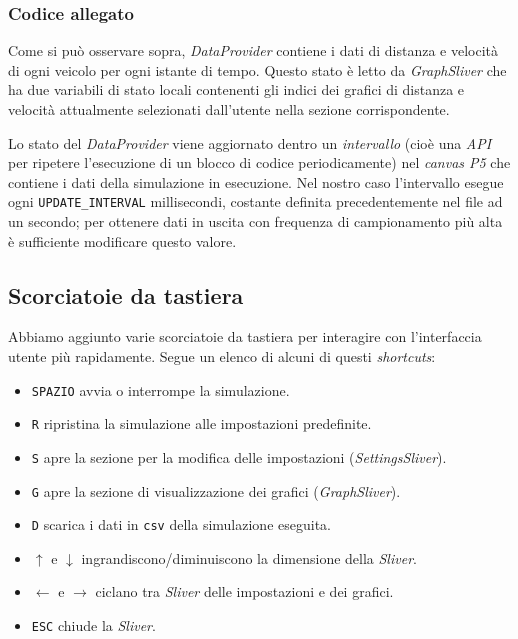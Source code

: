 \newpage
\subsubsection*{Codice allegato}

\vspace{0.3em}

\vspace{0.6em}

Come si può osservare sopra, \textit{DataProvider} contiene i dati di distanza e velocità di ogni veicolo per ogni istante di tempo. Questo stato è letto da \textit{GraphSliver} che ha due variabili di stato locali contenenti gli indici dei grafici di distanza e velocità attualmente selezionati dall'utente nella sezione corrispondente.

Lo stato del \textit{DataProvider} viene aggiornato dentro un \textit{intervallo} (cioè una \textit{API} per ripetere l'esecuzione di un blocco di codice periodicamente) nel \textit{canvas P5} che contiene i dati della simulazione in esecuzione. Nel nostro caso l'intervallo esegue ogni \texttt{UPDATE\_INTERVAL} millisecondi, costante definita precedentemente nel file ad un secondo; per ottenere dati in uscita con frequenza di campionamento più alta è sufficiente modificare questo valore.

\newpage
\subsection{Scorciatoie da tastiera}

Abbiamo aggiunto varie scorciatoie da tastiera per interagire con l'interfaccia utente più rapidamente. Segue un elenco di alcuni di questi \textit{shortcuts}: 
\begin{itemize}
\setlength{\itemsep}{-0.1em}
    \item \texttt{SPAZIO} avvia o interrompe la simulazione.
    \item \texttt{R} ripristina la simulazione alle impostazioni predefinite.
    \item \texttt{S} apre la sezione per la modifica delle impostazioni (\textit{SettingsSliver}).
    \item \texttt{G} apre la sezione di visualizzazione dei grafici (\textit{GraphSliver}).
    \item \texttt{D} scarica i dati in \texttt{csv} della simulazione eseguita.
    \item \texttt{$\uparrow$} e \texttt{$\downarrow$} ingrandiscono/diminuiscono la dimensione della \textit{Sliver}.
    \item \texttt{$\leftarrow$} e \texttt{$\rightarrow$} ciclano tra \textit{Sliver} delle impostazioni e dei grafici.
    \item \texttt{ESC} chiude la \textit{Sliver}.
\end{itemize}

